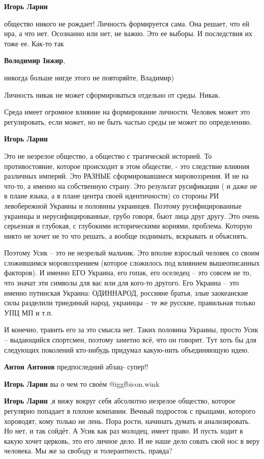 \begin{itemize}
\begin{itemize}
\textbf{Игорь Ларин} 

общество никого не рождает! Личность формируется сама. Она решает, что ей нра,
а что нет. Осознанно или нет, не важно. Это ее выборы. И последствия их тоже
ее. Как-то так

\textbf{Володимир Інжир}, 

никогда больше нигде этого не повторяйте, Владимир)

Личность никак не может сформироваться отдельно от среды. Никак.

Среда имеет огромное влияние на формирование личности. Человек может это
регулировать, если может, но не быть частью среды не может по определению.

\textbf{Игорь Ларин} 

Это не незрелое общество, а общество с трагической историей. То противостояние,
которое происходит в этом обществе, - это следствие влияния различных империй.
Это РАЗНЫЕ сформировавшиеся мировоззрения. И не на что-то, а именно на
собственную страну. Это результат русификации ( и даже не в плане языка, а в
плане центра своей идентичности) со стороны РИ левобережной Украины и половины
украинцев. Поэтому русифицированные украинцы и нерусифицированные, грубо
говоря, бьют лица друг другу. Это очень серьезная и глубокая, с глубокими
историческими корнями, проблема. Которую никто не хочет не то что решать, а
вообще поднимать, вскрывать и объяснять.

Поэтому Усик – это не незрелый мальчик. Это вполне взрослый человек со своим
сложившимся моровоззрением (которое сложилось под влиянием вышеописанных
факторов). И именно ЕГО Украина, его гопак, его оселедец – это совсем не то,
что значат эти символы для вас или для кого-то другого. Его Украина – это
именно путинская Украина: ОДИННАРОД, россияне братья, злые заокеанские силы
разделили триединый народ, украинцы – те же русские, правильная только УПЦ МП и
т.п.

И конечно, травить его за это смысла нет. Таких половина Украины, просто Усик –
выдающийся спортсмен, поэтому заметно всё, что он говорит. Тут хоть бы для
следующих поколений кто-нибудь придумал какую-нить объединяющую идею.

\textbf{Антон Антонов} предпоследний абзац- супер!!

\textbf{Игорь Ларин} вы о чем то своём @igg{fbicon.wink} 

\textbf{Игорь Ларин} ,я вижу вокруг себя абсолютно незрелое общество, которое
регулярно попадает в плохие компании. Вечный подросток с прыщами, которого
хороводят, кому только не лень. Пора рости, начинать думать и анализировать. Но
нет, и так сойдёт. А Усик как раз молодец, имеет право. И пусть ходит в какую хочет
церковь, это его личное дело. И не наше дело совать свой нос в веру человека. Мы
же за свободу и толерантность, правда?


\end{itemize}
\end{itemize}
